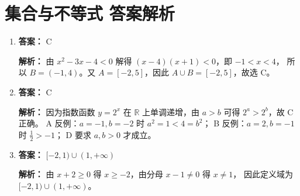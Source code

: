 \documentclass[11pt,a4paper]{article}
\begin{document}
\section*{集合与不等式 答案解析}

\begin{enumerate}[label=\textbf{题 \arabic*}]

\item \textbf{答案：} C

\textbf{解析：} 由 \( x^2 - 3x - 4 < 0 \) 解得 \( (x-4)(x+1) < 0 \)，即 \( -1 < x < 4 \)，
所以 \( B = (-1, 4) \)。又 \( A = [-2, 5] \)，因此 \( A \cup B = [-2, 5] \)，故选 C。

\item \textbf{答案：} C

\textbf{解析：} 因为指数函数 \( y = 2^x \) 在 \( \mathbb{R} \) 上单调递增，由 \( a > b \) 可得 \( 2^a > 2^b \)，故 C 正确。
A 反例：\( a = -1, b = -2 \) 时 \( a^2 = 1 < 4 = b^2 \)；
B 反例：\( a = 2, b = -1 \) 时 \( \frac{1}{2} > -1 \)；
D 要求 \( a, b > 0 \) 才成立。

\item \textbf{答案：} \( [-2, 1) \cup (1, +\infty) \)

\textbf{解析：} 由 \( x+2 \geq 0 \) 得 \( x \geq -2 \)，由分母 \( x-1 \neq 0 \) 得 \( x \neq 1 \)，
因此定义域为 \( [-2, 1) \cup (1, +\infty) \)。

\end{enumerate}
\end{document}
